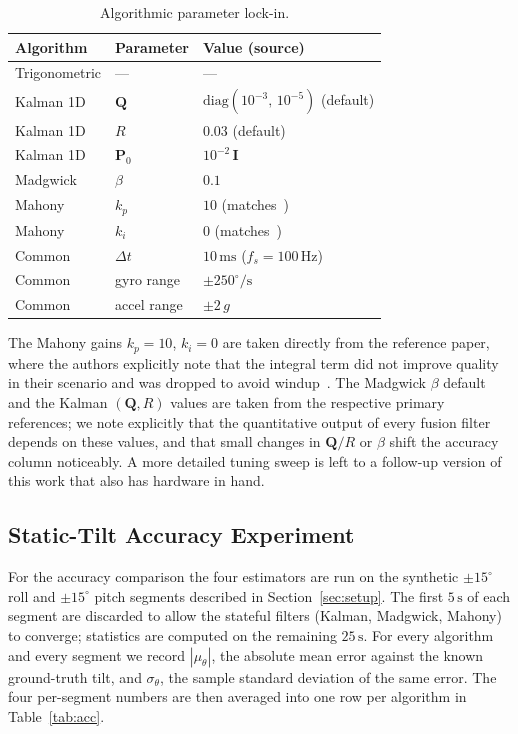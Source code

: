 \documentclass[conference]{IEEEtran}
\newcommand{\bm}[1]{\mathbf{#1}}
\newcommand{\degr}{^{\circ}}
\begin{document}
\begin{table}[t]
\caption{Algorithmic parameter lock-in.}
\label{tab:params}
\centering
\renewcommand{\arraystretch}{1.15}
\begin{tabular}{@{}lll@{}}
\toprule
Algorithm  & Parameter  & Value (source) \\
\midrule
Trigonometric & ---             & ---                                \\
Kalman 1D     & $\bm{Q}$        & $\mathrm{diag}(10^{-3},\,10^{-5})$ (default) \\
Kalman 1D     & $R$             & $0.03$ (default) \\
Kalman 1D     & $\bm{P}_0$      & $10^{-2}\,\bm{I}$ \\
Madgwick      & $\beta$         & $0.1$~\cite{madgwick2010} \\
Mahony        & $k_p$           & $10$ (matches~\cite{badia2023})    \\
Mahony        & $k_i$           & $0$  (matches~\cite{badia2023})    \\
Common        & $\Delta t$      & $10\,\mathrm{ms}$ ($f_s=100\,\mathrm{Hz}$) \\
Common        & gyro range      & $\pm 250\degr/\mathrm{s}$           \\
Common        & accel range     & $\pm 2\,g$                          \\
\bottomrule
\end{tabular}
\end{table}

The Mahony gains $k_p = 10$, $k_i = 0$ are taken directly from the
reference paper, where the authors explicitly note that the
integral term did not improve quality in their scenario and was
dropped to avoid windup~\cite{badia2023}. The Madgwick $\beta$
default and the Kalman $(\bm{Q}, R)$ values are taken from the
respective primary references; we note explicitly that the
quantitative output of every fusion filter depends on these
values, and that small changes in $\bm{Q}/R$ or $\beta$ shift the
accuracy column noticeably. A more detailed tuning sweep is left
to a follow-up version of this work that also has hardware in
hand.

\subsection{Static-Tilt Accuracy Experiment}

For the accuracy comparison the four estimators are run on the
synthetic $\pm 15\degr$ roll and $\pm 15\degr$ pitch segments
described in Section~\ref{sec:setup}. The first $5\,\mathrm{s}$
of each segment are discarded to allow the stateful filters
(Kalman, Madgwick, Mahony) to converge; statistics are computed
on the remaining $25\,\mathrm{s}$. For every algorithm and every
segment we record $|\mu_\theta|$, the absolute mean error against
the known ground-truth tilt, and $\sigma_\theta$, the sample
standard deviation of the same error. The four per-segment numbers
are then averaged into one row per algorithm in
Table~\ref{tab:acc}.
\end{document}
